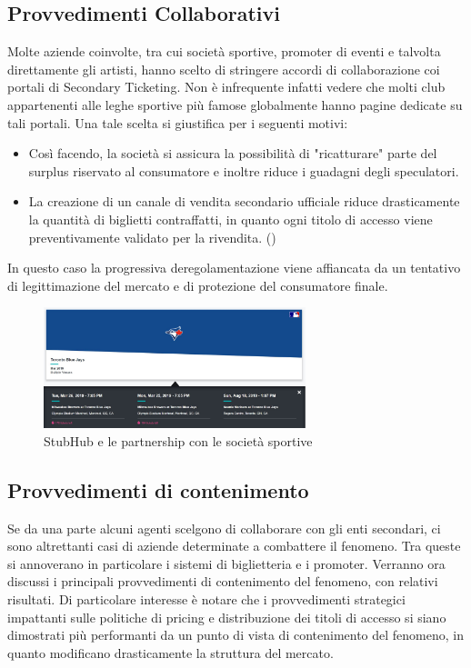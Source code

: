 \subsection {Provvedimenti Collaborativi}
Molte aziende coinvolte, tra cui società sportive, promoter di eventi e talvolta direttamente gli artisti, hanno scelto di stringere accordi di collaborazione coi portali di Secondary Ticketing. Non è infrequente infatti vedere che molti club appartenenti alle leghe sportive più famose globalmente hanno pagine dedicate su tali portali. Una tale scelta si giustifica per i seguenti motivi: 
\begin{itemize}
\item Così facendo, la società si assicura la possibilità di "ricatturare" parte del surplus riservato al consumatore e inoltre riduce i guadagni degli speculatori.
\item La creazione di un canale di vendita secondario ufficiale riduce drasticamente la quantità di biglietti contraffatti, in quanto ogni titolo di accesso viene preventivamente validato per la rivendita. (\cite{shapiro2014examination})
\end{itemize}
In questo caso la progressiva deregolamentazione viene affiancata da un tentativo di legittimazione del mercato e di protezione del consumatore finale.
\begin{figure}[H]
	\centering
	\includegraphics[width=0.68\textwidth]{chapter3/immagini/StubHub_Club}
	\caption{StubHub e le partnership con le società sportive}
	\label{stubhub_part}
\end{figure}

\subsection{Provvedimenti di contenimento}
Se da una parte alcuni agenti scelgono di collaborare con gli enti secondari, ci sono altrettanti casi di aziende determinate a combattere il fenomeno. Tra queste si annoverano in particolare i sistemi di biglietteria e i promoter. 
Verranno ora discussi i principali provvedimenti di contenimento del fenomeno, con relativi risultati. 
Di particolare interesse è notare che i provvedimenti strategici impattanti sulle politiche di pricing e distribuzione dei titoli di accesso si siano dimostrati più performanti da un punto di vista di contenimento del fenomeno, in quanto modificano drasticamente la struttura del mercato. 
